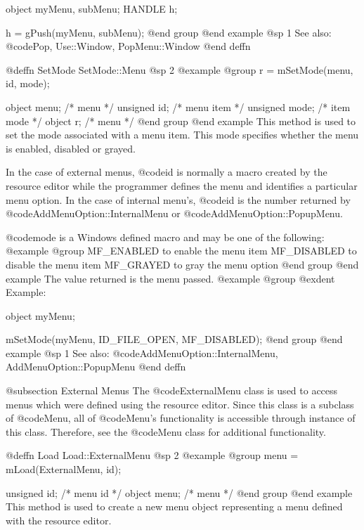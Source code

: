 object  myMenu, subMenu;
HANDLE  h;

h = gPush(myMenu, subMenu);
@end group
@end example
@sp 1
See also:  @code{Pop, Use::Window, PopMenu::Window}
@end deffn








@deffn {SetMode} SetMode::Menu
@sp 2
@example
@group
r = mSetMode(menu, id, mode);

object  menu;   /*  menu       */
unsigned  id;   /*  menu item  */
unsigned  mode; /*  item mode  */
object    r;    /*  menu       */
@end group
@end example
This method is used to set the mode associated with a menu item.  This
mode specifies whether the menu is enabled, disabled or grayed.

In the case of external menus, @code{id} is normally a macro created by
the resource editor while the programmer defines the menu and identifies
a particular menu option.  In the case of internal menu's, @code{id}
is the number returned by @code{AddMenuOption::InternalMenu} or
@code{AddMenuOption::PopupMenu}.

@code{mode} is a Windows defined macro and may be one of the following:
@example
@group
MF_ENABLED      to enable the menu item
MF_DISABLED     to disable the menu item
MF_GRAYED       to gray the menu option
@end group
@end example
The value returned is the menu passed.
@example
@group
@exdent Example:

object  myMenu;

mSetMode(myMenu, ID_FILE_OPEN, MF_DISABLED);
@end group
@end example
@sp 1
See also:  @code{AddMenuOption::InternalMenu, AddMenuOption::PopupMenu}
@end deffn






@subsection External Menus
The @code{ExternalMenu} class is used to access menus which were defined
using the resource editor.  Since this class is a subclass of @code{Menu},
all of @code{Menu}'s functionality is accessible through instance of this
class.  Therefore, see the @code{Menu} class for additional functionality.







@deffn {Load} Load::ExternalMenu
@sp 2
@example
@group
menu = mLoad(ExternalMenu, id);

unsigned  id;   /*  menu id  */
object  menu;   /*  menu     */
@end group
@end example
This method is used to create a new menu object representing a menu defined
with the resource editor.

